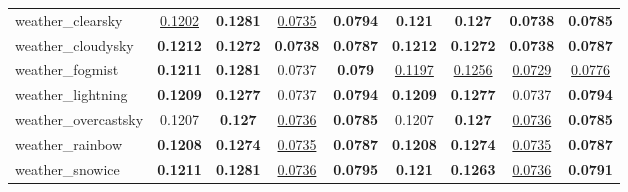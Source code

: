 \begin{center}
\begin{supertabular}{lcccc||cccc}
\small{weather\_clearsky} & \underline{\scriptsize{0.1202}} & \textbf{\scriptsize{0.1281}} & \underline{\scriptsize{0.0735}} & \textbf{\scriptsize{0.0794}}& \textbf{\scriptsize{0.121}} & \textbf{\scriptsize{0.127}} & \textbf{\scriptsize{0.0738}} & \textbf{\scriptsize{0.0785}}\\
\small{weather\_cloudysky} & \textbf{\scriptsize{0.1212}} & \textbf{\scriptsize{0.1272}} & \textbf{\scriptsize{0.0738}} & \textbf{\scriptsize{0.0787}}& \textbf{\scriptsize{0.1212}} & \textbf{\scriptsize{0.1272}} & \textbf{\scriptsize{0.0738}} & \textbf{\scriptsize{0.0787}}\\
\small{weather\_fogmist} & \textbf{\scriptsize{0.1211}} & \textbf{\scriptsize{0.1281}} & {\scriptsize{0.0737}} & \textbf{\scriptsize{0.079}}& \underline{\scriptsize{0.1197}} & \underline{\scriptsize{0.1256}} & \underline{\scriptsize{0.0729}} & \underline{\scriptsize{0.0776}}\\
\small{weather\_lightning} & \textbf{\scriptsize{0.1209}} & \textbf{\scriptsize{0.1277}} & {\scriptsize{0.0737}} & \textbf{\scriptsize{0.0794}}& \textbf{\scriptsize{0.1209}} & \textbf{\scriptsize{0.1277}} & {\scriptsize{0.0737}} & \textbf{\scriptsize{0.0794}}\\
\small{weather\_overcastsky} & {\scriptsize{0.1207}} & \textbf{\scriptsize{0.127}} & \underline{\scriptsize{0.0736}} & \textbf{\scriptsize{0.0785}}& {\scriptsize{0.1207}} & \textbf{\scriptsize{0.127}} & \underline{\scriptsize{0.0736}} & \textbf{\scriptsize{0.0785}}\\
\small{weather\_rainbow} & \textbf{\scriptsize{0.1208}} & \textbf{\scriptsize{0.1274}} & \underline{\scriptsize{0.0735}} & \textbf{\scriptsize{0.0787}}& \textbf{\scriptsize{0.1208}} & \textbf{\scriptsize{0.1274}} & \underline{\scriptsize{0.0735}} & \textbf{\scriptsize{0.0787}}\\
\small{weather\_snowice} & \textbf{\scriptsize{0.1211}} & \textbf{\scriptsize{0.1281}} & \underline{\scriptsize{0.0736}} & \textbf{\scriptsize{0.0795}}& \textbf{\scriptsize{0.121}} & \textbf{\scriptsize{0.1263}} & \underline{\scriptsize{0.0736}} & \textbf{\scriptsize{0.0791}}\\



\end{supertabular}
\end{center}
		

